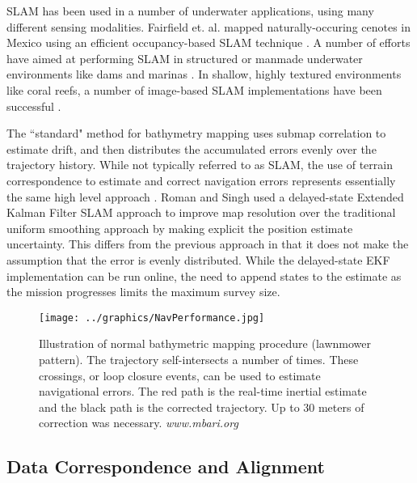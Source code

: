 SLAM has been used in a number of underwater applications, using many different sensing modalities. Fairfield et. al. mapped naturally-occuring cenotes in Mexico using an efficient occupancy-based SLAM technique \cite{Fairfield2007}. A number of efforts have aimed at performing SLAM in structured or manmade underwater environments like dams and marinas \cite{Ribas2008}. In shallow, highly textured environments like coral reefs, a number of image-based SLAM implementations have been successful \cite{Eustice2005}.

The ``standard" method for bathymetry mapping uses submap correlation to estimate drift, and then distributes the accumulated errors evenly over the trajectory history. While not typically referred to as SLAM, the use of terrain correspondence to estimate and correct navigation errors represents essentially the same high level approach \cite{Henthorn2006}.  Roman and Singh used a delayed-state Extended Kalman Filter SLAM approach to improve map resolution over the traditional uniform smoothing approach by making explicit the position estimate uncertainty\cite{Roman2005}. This differs from the previous approach in that it does not make the assumption that the error is evenly distributed. While the delayed-state EKF implementation can be run online, the need to append states to the estimate as the mission progresses limits the maximum survey size.

 \begin{figure}[!htb]
   \centering
   \texttt{[image: ../graphics/NavPerformance.jpg]} %
   \caption{Illustration of normal bathymetric mapping procedure (lawnmower pattern). The trajectory self-intersects a number of times. These crossings, or loop closure events, can be used to estimate navigational errors. The red path is the real-time inertial estimate and the black path is the corrected trajectory. Up to 30 meters of correction was necessary. \emph{www.mbari.org} }
   \label{fig:BathyMapping}
\end{figure}


\subsection{Data Correspondence and Alignment}

